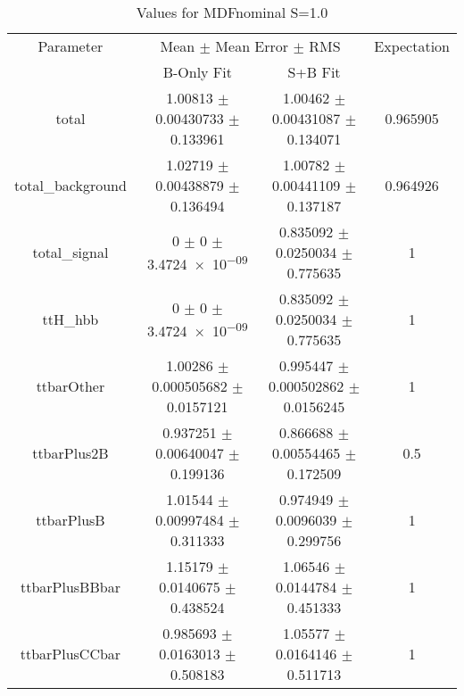 \begin{table}
\centering
\caption{Values for MDFnominal S=1.0}
\begin{tabular}{cccc}
\toprule
Parameter & \multicolumn{2}{c}{Mean $\pm$ Mean Error $\pm$ RMS} & Expectation\\
 & B-Only Fit & S+B Fit & \\
\midrule
total & \num{1.00813} $\pm$ \num{0.00430733} $\pm$ \num{0.133961} & \num{1.00462} $\pm$ \num{0.00431087} $\pm$ \num{0.134071} & \num{0.965905}\\
total\_background & \num{1.02719} $\pm$ \num{0.00438879} $\pm$ \num{0.136494} & \num{1.00782} $\pm$ \num{0.00441109} $\pm$ \num{0.137187} & \num{0.964926}\\
total\_signal & \num{0} $\pm$ \num{0} $\pm$ \num{3.4724e-09} & \num{0.835092} $\pm$ \num{0.0250034} $\pm$ \num{0.775635} & \num{1}\\
ttH\_hbb & \num{0} $\pm$ \num{0} $\pm$ \num{3.4724e-09} & \num{0.835092} $\pm$ \num{0.0250034} $\pm$ \num{0.775635} & \num{1}\\
ttbarOther & \num{1.00286} $\pm$ \num{0.000505682} $\pm$ \num{0.0157121} & \num{0.995447} $\pm$ \num{0.000502862} $\pm$ \num{0.0156245} & \num{1}\\
ttbarPlus2B & \num{0.937251} $\pm$ \num{0.00640047} $\pm$ \num{0.199136} & \num{0.866688} $\pm$ \num{0.00554465} $\pm$ \num{0.172509} & \num{0.5}\\
ttbarPlusB & \num{1.01544} $\pm$ \num{0.00997484} $\pm$ \num{0.311333} & \num{0.974949} $\pm$ \num{0.0096039} $\pm$ \num{0.299756} & \num{1}\\
ttbarPlusBBbar & \num{1.15179} $\pm$ \num{0.0140675} $\pm$ \num{0.438524} & \num{1.06546} $\pm$ \num{0.0144784} $\pm$ \num{0.451333} & \num{1}\\
ttbarPlusCCbar & \num{0.985693} $\pm$ \num{0.0163013} $\pm$ \num{0.508183} & \num{1.05577} $\pm$ \num{0.0164146} $\pm$ \num{0.511713} & \num{1}\\
\bottomrule
\end{tabular}
\end{table}